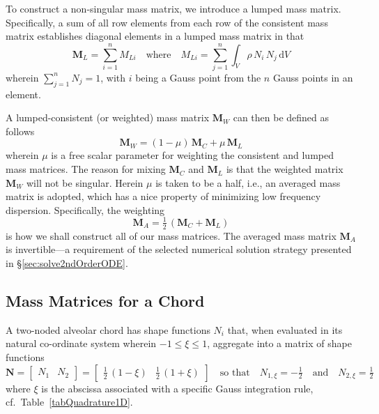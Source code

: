 To construct a non-singular mass matrix, we introduce a lumped mass matrix.  Specifically, a sum of all row elements from each row of the consistent mass matrix establishes diagonal elements in a lumped mass matrix \cite{Reddy93} in that
\begin{equation}
\mathbf{M}_L = \sum_{i=1}^n M_{Li} 
\quad \text{where} \quad
M_{Li} = \sum_{j=1}^n \int_{V} \rho \, N_i \, N_j \, \mathrm{d} V 
\label{lumpedMassMatrix}
\end{equation}
wherein $\sum_{j=1}^n N_j = 1$, with $i$ being a Gauss point from the $n$ Gauss points in an element.

A lumped-consistent (or weighted) mass matrix $\mathbf{M}_W $ can then be defined as follows
\begin{equation}
\mathbf{M}_W  = (1 - \mu) \, \mathbf{M}_{C} + \mu \, \mathbf{M}_{L}
\end{equation}
wherein $\mu$ is a free scalar parameter for weighting the consistent and lumped mass matrices.  The reason for mixing $\mathbf{M}_C$ and $\mathbf{M}_L$ is that the weighted matrix $\mathbf{M}_W$ will not be singular.  Herein $\mu$ is taken to be a half, i.e., an averaged mass matrix is adopted, which has a nice property of minimizing low frequency dispersion.  Specifically, the weighting
\begin{equation}
\mathbf{M}_A  = \tfrac{1}{2} \, (\mathbf{M}_{C} + \mathbf{M}_{L})
\label{LumconsMass}
\end{equation}
is how we shall construct all of our mass matrices.  The averaged mass matrix $\mathbf{M}_A$ is invertible---a requirement of the selected numerical solution strategy presented in \S\ref{sec:solve2ndOrderODE}.

\subsection{Mass Matrices for a Chord}

A two-noded alveolar chord has shape functions $N_i$ that, when evaluated in its natural co-ordinate system wherein $-1 \leq \xi \leq 1$, aggregate into a matrix of shape functions
\begin{equation}
\mathbf{N} = \begin{bmatrix} N_1 & N_2 \end{bmatrix} =
\begin{bmatrix}
\frac{1}{2} \, (1 - \xi) &  \frac{1}{2} \, (1 + \xi)
\end{bmatrix} 
\quad \text{so that} \quad
N_{1,\xi} = -\tfrac{1}{2} 
\quad \text{and} \quad
N_{2,\xi} = \tfrac{1}{2}
\end{equation}
where $\xi$ is the abscissa associated with a specific Gauss integration rule, cf.\ Table~\ref{tabQuadrature1D}.

